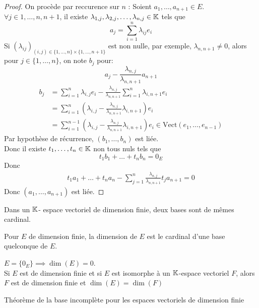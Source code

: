 \documentclass[]{report}
\begin{document}
\begin{proof}
    On procède par reccurence sur $n$ : Soient $a_1,\ldots,a_{n+1}\in E$. $\forall j\in {1,\ldots,n,n+1}$, il existe $\lambda_{1,j},\lambda_{2,j},\ldots,\lambda_{n,j}\in \mathbb{K}$ tels que
    \[a_j=\sum_{i=1}^{n}\lambda_{ij} e_i\]
    Si $\left(\lambda_{ij}\right)_{(i,j)\in \{1,\ldots,n\}\times \{1,\ldots,n+1\}}$ est non nulle, par exemple, $\lambda_{n,n+1}\neq 0$, alors pour $j\in \{1,\ldots,n\}$, on note $b_j$ pour:
    \[a_j-\frac{\lambda_{n,j}}{\lambda_{n,n+1}} a_{n+1}\]
    \begin{align*}
        b_j&=\sum_{i=1}^{n}\lambda_{i,j}e_i-\frac{ \lambda_{n,j}}{\lambda_{n,n+1}}\sum_{i=1}^{n}\lambda_{i,n+1} e_i\\
        &=\sum_{i=1}^{n}\left(\lambda_{i,j}-\frac{\lambda_{n,j}}{\lambda_{n,n+1} }\lambda_{i,n+1}\right) e_i\\
        &=\sum_{i=1}^{n-1}\left(\lambda_{i,j}-\frac{\lambda_{n,j}}{\lambda_{n,n+1} }\lambda_{i,n+1}\right) e_i\in \text{Vect}(e_1,\ldots,e_{n-1})
    \end{align*}
    Par hypothèse de récurrence, $(b_1,\ldots,b_n)$ est liée.\\
    Donc il existe $t_1,\ldots, t_n\in \mathbb{K}$ non tous nuls tels que
    \[t_1 b_1+\ldots+ t_n b_n=0_E\]
    Donc
    \begin{align*}
        t_1 a_1+\ldots+t_n a_n -\sum_{j=1}^{n}\frac{\lambda_{n,j}}{\lambda_{n,n+1}} t_j a_{n+1}=0
    \end{align*}
    Donc $(a_1,\ldots,a_{n+1})$ est liée.
\end{proof}

\begin{cor}{}{}
    Dans un $\mathbb{K}$- espace vectoriel de dimension finie, deux bases sont de mêmes cardinal.
\end{cor}

\begin{df}{}{}
    Pour $E$ de dimension finie, la dimension de $E$ est le cardinal d'une base quelconque de $E$.
\end{df}

\begin{re}{}{}
    $E=\{0_E\}\implies \dim(E)=0$. \\
    Si $E$ est de dimension finie et si $E$ est isomorphe à un $\mathbb{K}$-espace vectoriel $F$, alors $F$ est de dimension finie et $\dim(E)=\dim (F)$
\end{re}

\begin{tm}{Théorème de la base incomplète pour les espaces vectoriels de dimension finie}{}
    
\end{tm}
\end{document}
